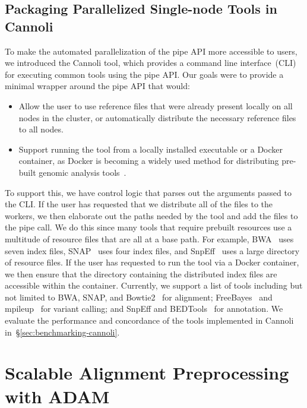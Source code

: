 \documentclass[phd]{ucbthesis}
\begin{document}
\section{Packaging Parallelized Single-node Tools in {Cannoli}}
\label{sec:parallelizing-in-cannoli}

To make the automated parallelization of the {pipe} API more accessible
to users, we introduced the {Cannoli} tool, which provides a command line
interface~(CLI) for executing common tools using the {pipe} API. Our
goals were to provide a minimal wrapper around the {pipe} API that would:

\begin{itemize}
\item Allow the user to use reference files that were already present locally on
  all nodes in the cluster, or automatically distribute the necessary reference
  files to all nodes.
\item Support running the tool from a locally installed executable or a
  {Docker} container, as {Docker} is becoming a widely used method
  for distributing pre-built genomic analysis tools~\cite{vivian17}.
\end{itemize}

To support this, we have control logic that parses out the arguments passed to
the CLI. If the user has requested that we distribute all of the files to the
workers, we then elaborate out the paths needed by the tool and add the files
to the {pipe} call. We do this since many tools that require prebuilt
resources use a multitude of resource files that are all at a base path. For
example, BWA~\cite{li09bwa} uses seven index files, SNAP~\cite{zaharia11} uses
four index files, and {SnpEff}~\cite{cingolani12} uses a large directory of
resource files. If the user has requested to run the tool via a {Docker}
container, we then ensure that the directory containing the distributed
index files are accessible within the container. Currently, we support a list of
tools including but not limited to BWA, SNAP, and
{Bowtie2}~\cite{langmead09bowtie} for alignment;
{FreeBayes}~\cite{garrison12} and {mpileup}~\cite{li11} for
variant calling; and {SnpEff} and {BEDTools}~\cite{quinlan10} for
annotation. We evaluate the performance and concordance of the tools implemented
in {Cannoli} in~\S\ref{sec:benchmarking-cannoli}.

\chapter{Scalable Alignment Preprocessing with {ADAM}}
\label{chap:adam}
\end{document}
